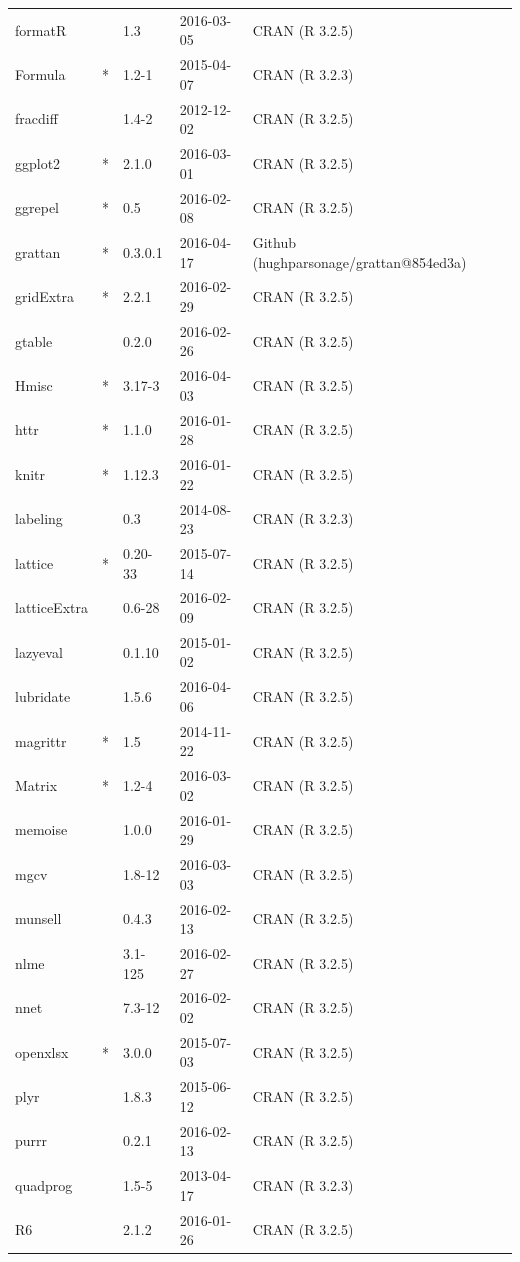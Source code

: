 \begin{subappendices}
\begin{longtable}{lllll}
  formatR &  & 1.3 & 2016-03-05 & CRAN (R 3.2.5) \\ 
  Formula & * & 1.2-1 & 2015-04-07 & CRAN (R 3.2.3) \\ 
  fracdiff &  & 1.4-2 & 2012-12-02 & CRAN (R 3.2.5) \\ 
  ggplot2 & * & 2.1.0 & 2016-03-01 & CRAN (R 3.2.5) \\ 
  ggrepel & * & 0.5 & 2016-02-08 & CRAN (R 3.2.5) \\ 
  grattan & * & 0.3.0.1 & 2016-04-17 & Github (hughparsonage/grattan@854ed3a) \\ 
  gridExtra & * & 2.2.1 & 2016-02-29 & CRAN (R 3.2.5) \\ 
  gtable &  & 0.2.0 & 2016-02-26 & CRAN (R 3.2.5) \\ 
  Hmisc & * & 3.17-3 & 2016-04-03 & CRAN (R 3.2.5) \\ 
  httr & * & 1.1.0 & 2016-01-28 & CRAN (R 3.2.5) \\ 
  knitr & * & 1.12.3 & 2016-01-22 & CRAN (R 3.2.5) \\ 
  labeling &  & 0.3 & 2014-08-23 & CRAN (R 3.2.3) \\ 
  lattice & * & 0.20-33 & 2015-07-14 & CRAN (R 3.2.5) \\ 
  latticeExtra &  & 0.6-28 & 2016-02-09 & CRAN (R 3.2.5) \\ 
  lazyeval &  & 0.1.10 & 2015-01-02 & CRAN (R 3.2.5) \\ 
  lubridate &  & 1.5.6 & 2016-04-06 & CRAN (R 3.2.5) \\ 
  magrittr & * & 1.5 & 2014-11-22 & CRAN (R 3.2.5) \\ 
  Matrix & * & 1.2-4 & 2016-03-02 & CRAN (R 3.2.5) \\ 
  memoise &  & 1.0.0 & 2016-01-29 & CRAN (R 3.2.5) \\ 
  mgcv &  & 1.8-12 & 2016-03-03 & CRAN (R 3.2.5) \\ 
  munsell &  & 0.4.3 & 2016-02-13 & CRAN (R 3.2.5) \\ 
  nlme &  & 3.1-125 & 2016-02-27 & CRAN (R 3.2.5) \\ 
  nnet &  & 7.3-12 & 2016-02-02 & CRAN (R 3.2.5) \\ 
  openxlsx & * & 3.0.0 & 2015-07-03 & CRAN (R 3.2.5) \\ 
  plyr &  & 1.8.3 & 2015-06-12 & CRAN (R 3.2.5) \\ 
  purrr &  & 0.2.1 & 2016-02-13 & CRAN (R 3.2.5) \\ 
  quadprog &  & 1.5-5 & 2013-04-17 & CRAN (R 3.2.3) \\ 
  R6 &  & 2.1.2 & 2016-01-26 & CRAN (R 3.2.5) \\ 

\end{longtable}
\end{subappendices}
